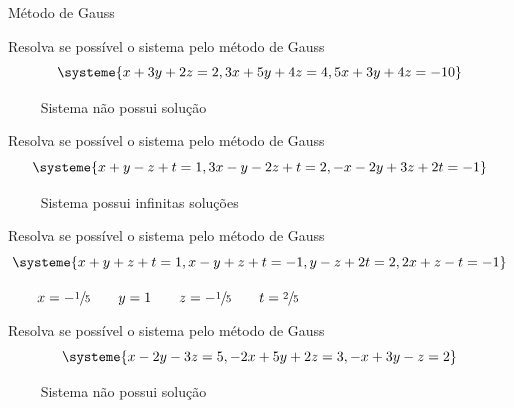 \begin{exercicios}{Método de Gauss}
    \begin{exercicio}
        Resolva se possível o sistema pelo método de Gauss
        \[\systeme{ x +3y  + 2z = 2,
            3x +5y +4z = 4,
            5x +3y +4z = -10}
        \]
        \begin{answers}
            \(\qquad \) Sistema não possui solução
        \end{answers}
    \end{exercicio}
    
    \begin{exercicio}
        Resolva se possível o sistema pelo método de Gauss
        \[\systeme{ x + y - z + t = 1,
            3x - y -2z + t = 2,
            -x -2y +3z +2t = -1}
        \]
        \begin{answers}
            \(\qquad \) Sistema possui infinitas soluções
        \end{answers}
    \end{exercicio}
    
    \begin{exercicio}
        Resolva se possível o sistema pelo método de Gauss
        \[\systeme{ x + y + z + t = 1,
            x - y + z + t = -1,
            y - z +2t = 2,
            2x + z - t = -1 }
        \]
        \begin{answers}
            \(\qquad x=-\sfrac{1}{5} \qquad y=1 \qquad z=-\sfrac{1}{5} \qquad t=\sfrac{2}{5} \)
        \end{answers}
    \end{exercicio}
    
    \begin{exercicio}
        Resolva se possível o sistema pelo método de Gauss
        \[\systeme{ x -2y -3z = 5,
            -2x +5y +2z = 3,
            -x +3y - z = 2}
        \]
        \begin{answers}
            \(\qquad \) Sistema não possui solução
        \end{answers}
    \end{exercicio}
    
\end{exercicios} %

